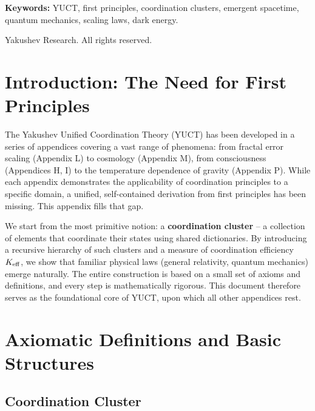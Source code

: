 \documentclass[12pt,a4paper]{article}
\newcommand{\Keff}[1][]{K_{\mathrm{eff}\if\relax\detokenize{#1}\relax\else,#1\fi}}   %
\begin{document}
\begin{titlepage}
\begin{center}
			\vspace{0.5cm}
			
			\noindent
			\small\textbf{Keywords:} YUCT, first principles, coordination clusters, emergent spacetime, quantum mechanics, scaling laws, dark energy.
			
			\vspace{0.5cm}
			
			\noindent
			 Yakushev Research. All rights reserved.
		\end{center}
	\end{titlepage}
	
	\tableofcontents
	\newpage
	
	\section{Introduction: The Need for First Principles}
	
	The Yakushev Unified Coordination Theory (YUCT) has been developed in a series of appendices covering a vast range of phenomena: from fractal error scaling (Appendix L) to cosmology (Appendix M), from consciousness (Appendices H, I) to the temperature dependence of gravity (Appendix P). While each appendix demonstrates the applicability of coordination principles to a specific domain, a unified, self-contained derivation from first principles has been missing. This appendix fills that gap.
	
	We start from the most primitive notion: a \textbf{coordination cluster} -- a collection of elements that coordinate their states using shared dictionaries. By introducing a recursive hierarchy of such clusters and a measure of coordination efficiency $\Keff$, we show that familiar physical laws (general relativity, quantum mechanics) emerge naturally. The entire construction is based on a small set of axioms and definitions, and every step is mathematically rigorous. This document therefore serves as the foundational core of YUCT, upon which all other appendices rest.
	
	\section{Axiomatic Definitions and Basic Structures}
	
	\subsection{Coordination Cluster}
	
\end{document}
